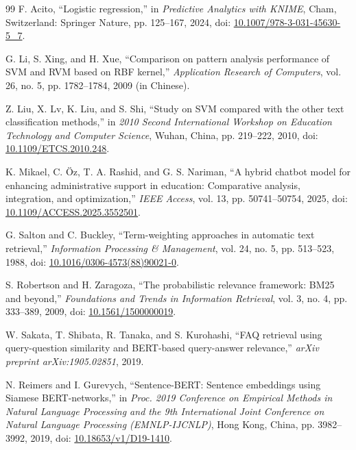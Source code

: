 \documentclass[12pt,a4paper]{article}
\begin{document}
\begin{thebibliography}{99}
F. Acito, ``Logistic regression,'' in \textit{Predictive Analytics with KNIME}, Cham, Switzerland: Springer Nature, pp. 125--167, 2024, doi: \href{https://doi.org/10.1007/978-3-031-45630-5_7}{10.1007/978-3-031-45630-5\_7}.

G. Li, S. Xing, and H. Xue, ``Comparison on pattern analysis performance of SVM and RVM based on RBF kernel,'' \textit{Application Research of Computers}, vol. 26, no. 5, pp. 1782--1784, 2009 (in Chinese).

Z. Liu, X. Lv, K. Liu, and S. Shi, ``Study on SVM compared with the other text classification methods,'' in \textit{2010 Second International Workshop on Education Technology and Computer Science}, Wuhan, China, pp. 219--222, 2010, doi: \href{https://doi.org/10.1109/ETCS.2010.248}{10.1109/ETCS.2010.248}.

K. Mikael, C. Öz, T. A. Rashid, and G. S. Nariman, ``A hybrid chatbot model for enhancing administrative support in education: Comparative analysis, integration, and optimization,'' \textit{IEEE Access}, vol. 13, pp. 50741--50754, 2025, doi: \href{https://doi.org/10.1109/ACCESS.2025.3552501}{10.1109/ACCESS.2025.3552501}.

G. Salton and C. Buckley, ``Term-weighting approaches in automatic text retrieval,'' \textit{Information Processing \& Management}, vol. 24, no. 5, pp. 513--523, 1988, doi: \href{https://doi.org/10.1016/0306-4573(88)90021-0}{10.1016/0306-4573(88)90021-0}.

S. Robertson and H. Zaragoza, ``The probabilistic relevance framework: BM25 and beyond,'' \textit{Foundations and Trends in Information Retrieval}, vol. 3, no. 4, pp. 333--389, 2009, doi: \href{https://doi.org/10.1561/1500000019}{10.1561/1500000019}.

W. Sakata, T. Shibata, R. Tanaka, and S. Kurohashi, ``FAQ retrieval using query-question similarity and BERT-based query-answer relevance,'' \textit{arXiv preprint arXiv:1905.02851}, 2019.

N. Reimers and I. Gurevych, ``Sentence-BERT: Sentence embeddings using Siamese BERT-networks,'' in \textit{Proc. 2019 Conference on Empirical Methods in Natural Language Processing and the 9th International Joint Conference on Natural Language Processing (EMNLP-IJCNLP)}, Hong Kong, China, pp. 3982--3992, 2019, doi: \href{https://doi.org/10.18653/v1/D19-1410}{10.18653/v1/D19-1410}.


\end{thebibliography}
\end{document}
